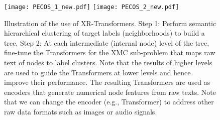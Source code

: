 \documentclass{article} \usepackage{iclr2022_conference,times}
\begin{document}
\begin{figure}
\centering
  \texttt{[image: PECOS\_1\_new.pdf]}
  \texttt{[image: PECOS\_2\_new.pdf]}
 \vspace{-0.5cm}
\caption{Illustration of the use of XR-Transformers. Step 1: Perform semantic hierarchical clustering of target labels (neighborhoods) to build a tree. Step 2: At each intermediate (internal node) level of the tree, fine-tune the Transformers for the XMC sub-problem that maps raw text of nodes to label clusters. Note that the results of higher levels are used to guide the Transformers at lower levels and hence improve their performance. The resulting Transformers are used as encoders that generate numerical node features from raw texts. Note that we can change the encoder (e.g., Transformer) to address other raw data formats such as images or audio signals.}\label{fig:XRT}
\vspace{-0.1in}
\end{figure}
\end{document}
